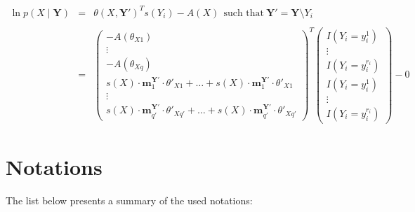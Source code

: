 \documentclass[11pt, oneside]{article}   	%
\numberwithin{figure}{section}
\numberwithin{equation}{section}
\numberwithin{table}{section}
\begin{document}
\begin{itemize}
\end{itemize}



\begin{eqnarray*}
\ln p(X\mid \mathbf{Y}) &=& \theta(X, \mathbf{Y'} )^T s(Y_i) - A(X) ~~\textrm{such~that} ~\mathbf{Y'} = \mathbf{Y} \setminus Y_i \\ \\
&=&
\begin{pmatrix}
- A(\theta_{X1}) \\
\vdots \\
- A(\theta_{Xq})\\
\! s(X) \cdot  \mathbf{m}^{\mathbf{Y'}}_1 \cdot \theta'_{X1}  +  \ldots + s(X) \cdot \mathbf{m}^{\mathbf{Y'}}_1 \cdot \theta'_{X1}\\
\vdots \\
\! s(X) \cdot  \mathbf{m}^{\mathbf{Y'}}_{q'} \cdot \theta'_{Xq'}   + \ldots + s(X) \cdot  \mathbf{m}^{\mathbf{Y'}}_{q'} \cdot \theta'_{Xq'}
\end{pmatrix}^T \!
\begin{pmatrix}
I(Y_i=y_i^1) \! \\
\vdots \\
I(Y_i=y_i^{r_i}) \!\\
I(Y_i=y_i^1) \! \\
\vdots \\
I(Y_i=y_i^{r_i}) \!
\end{pmatrix}
- 0 \!
\end{eqnarray*}


\newpage
\section*{Notations}

The list below presents a summary of the used notations:
\\
\end{document}
